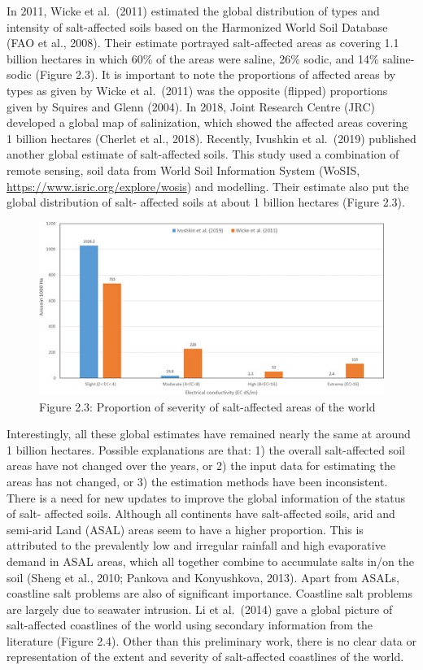 \documentclass[
  10pt,
  b5paper,
]{book}
\begin{document}
In 2011, Wicke et al.~(2011) estimated the global distribution of types and intensity of salt-affected soils based on the Harmonized World Soil Database (FAO et al., 2008). Their estimate portrayed salt-affected areas as covering 1.1 billion hectares in which 60\% of the areas were saline, 26\% sodic, and 14\% saline- sodic (Figure 2.3). It is important to note the proportions of affected areas by types as given by Wicke et al.~(2011) was the opposite (flipped) proportions given by Squires and Glenn (2004). In 2018, Joint Research Centre (JRC) developed a global map of salinization, which showed the affected areas covering 1 billion hectares (Cherlet et al., 2018).
Recently, Ivushkin et al.~(2019) published another global estimate of salt-affected soils. This study used a combination of remote sensing, soil data from World Soil Information System (WoSIS, \url{https://www.isric.org/explore/wosis}) and modelling. Their estimate also put the global distribution of salt- affected soils at about 1 billion hectares (Figure 2.3).

\begin{figure}
\centering
\includegraphics{figures/images/Figure2.3.jpg}
\caption{Figure 2.3: Proportion of severity of salt-affected areas of the world}
\end{figure}

Interestingly, all these global estimates have remained nearly the same at around 1 billion hectares. Possible explanations are that: 1) the overall salt-affected soil areas have not changed over the years, or
2) the input data for estimating the areas has not changed, or 3) the estimation methods have been inconsistent. There is a need for new updates to improve the global information of the status of salt- affected soils.
Although all continents have salt-affected soils, arid and semi-arid Land (ASAL) areas seem to have a higher proportion. This is attributed to the prevalently low and irregular rainfall and high evaporative demand in ASAL areas, which all together combine to accumulate salts in/on the soil (Sheng et al., 2010; Pankova and Konyushkova, 2013).
Apart from ASALs, coastline salt problems are also of significant importance. Coastline salt problems are largely due to seawater intrusion. Li et al.~(2014) gave a global picture of salt-affected coastlines of the world using secondary information from the literature (Figure 2.4). Other than this preliminary work, there is no clear data or representation of the extent and severity of salt-affected coastlines of the world.
\end{document}
